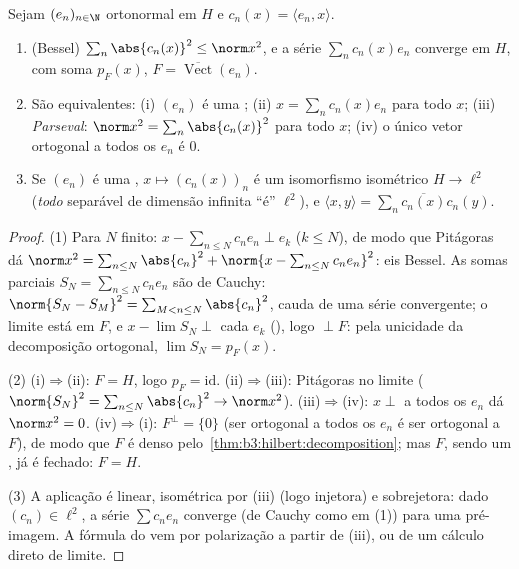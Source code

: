 \begin{theorem}\label{thm:b3:hilbert:parseval}
Sejam $(e_n)_{n\in\N}$ ortonormal em $H$ e $c_n(x) =
\langle e_n, x\rangle$.
\begin{enumerate}
  \item (Bessel) $\sum_n\abs{c_n(x)}^2 \leq \norm x^2$, e a série $\sum_nc_n(x)e_n$ converge em $H$, com soma
        $p_F(x)$, $F = \overline{\operatorname{Vect}}(e_n)$.
  \item São equivalentes: (i) $(e_n)$ é uma ; (ii)
        $x = \sum_nc_n(x)e_n$ para todo $x$; (iii) \emph{Parseval}: $\norm x^2
        = \sum_n\abs{c_n(x)}^2$ para todo $x$; (iv) o único vetor
        ortogonal a todos os $e_n$ é $0$.
  \item Se $(e_n)$ é uma , $x \mapsto (c_n(x))_n$ é um isomorfismo
        isométrico $H \to \ell^2$ (\emph{todo}  separável de
        dimensão infinita ``é'' $\ell^2$), e $\langle x, y\rangle =
        \sum_n\overline{c_n(x)}c_n(y)$.
\end{enumerate}
\end{theorem}

\begin{proof}
(1) Para $N$ finito: $x - \sum_{n\leq N}c_ne_n \perp e_k$ ($k
\leq N$), de modo que Pitágoras dá $\norm x^2 = \sum_{n\leq
N}\abs{c_n}^2 + \norm{x - \sum_{n\leq N}c_ne_n}^2$:
eis Bessel. As somas parciais $S_N = \sum_{n\leq N}c_ne_n$ são de Cauchy: $\norm{S_N - S_M}^2 = \sum_{M<n\leq N}\abs{c_n}^2$, cauda de uma
série convergente; o limite está em $F$, e $x - \lim S_N
\perp$ cada $e_k$
(), logo $\perp F$: pela unicidade da decomposição ortogonal,
$\lim S_N = p_F(x)$.

(2) (i)$\Rightarrow$(ii): $F = H$, logo $p_F = \mathrm{id}$. (ii)$\Rightarrow$(iii): Pitágoras no
limite ($\norm{S_N}^2
= \sum_{n \leq N}\abs{c_n}^2 \to \norm x^2$). (iii)$\Rightarrow$(iv): $x \perp$ a todos os $e_n$ dá $\norm x^2 =
0$.
(iv)$\Rightarrow$(i): $F^\perp = \{0\}$ (ser ortogonal a todos os $e_n$ é ser ortogonal a
$F$), de modo que $F$ é denso pelo~\cref{thm:b3:hilbert:decomposition}; mas $F$,
sendo um , já é fechado: $F = H$.

(3) A aplicação é linear, isométrica por (iii) (logo injetora) e
sobrejetora: dado $(c_n) \in \ell^2$, a série $\sum
c_ne_n$ converge (de Cauchy como em (1))
para uma pré-imagem. A fórmula do  vem por polarização a
partir de (iii), ou de um cálculo direto de limite.
\end{proof}

